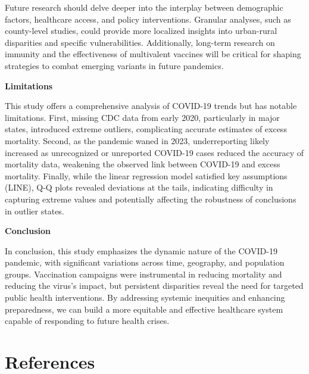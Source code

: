 \documentclass[
  letterpaper,
  DIV=11,
  numbers=noendperiod]{scrartcl}
\begin{document}
Future research should delve deeper into the interplay between
demographic factors, healthcare access, and policy interventions.
Granular analyses, such as county-level studies, could provide more
localized insights into urban-rural disparities and specific
vulnerabilities. Additionally, long-term research on immunity and the
effectiveness of multivalent vaccines will be critical for shaping
strategies to combat emerging variants in future pandemics.

\textbf{Limitations}

This study offers a comprehensive analysis of COVID-19 trends but has
notable limitations. First, missing CDC data from early 2020,
particularly in major states, introduced extreme outliers, complicating
accurate estimates of excess mortality. Second, as the pandemic waned in
2023, underreporting likely increased as unrecognized or unreported
COVID-19 cases reduced the accuracy of mortality data, weakening the
observed link between COVID-19 and excess mortality. Finally, while the
linear regression model satisfied key assumptions (LINE), Q-Q plots
revealed deviations at the tails, indicating difficulty in capturing
extreme values and potentially affecting the robustness of conclusions
in outlier states.

\textbf{Conclusion}

In conclusion, this study emphasizes the dynamic nature of the COVID-19
pandemic, with significant variations across time, geography, and
population groups. Vaccination campaigns were instrumental in reducing
mortality and reducing the virus's impact, but persistent disparities
reveal the need for targeted public health interventions. By addressing
systemic inequities and enhancing preparedness, we can build a more
equitable and effective healthcare system capable of responding to
future health crises.

\newpage

\section*{References}\label{references}
\end{document}
